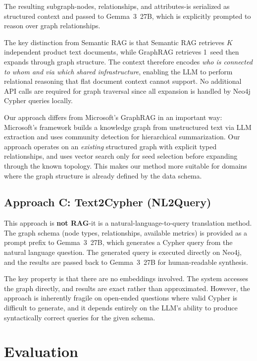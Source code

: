 \documentclass[11pt,a4paper]{article}
\begin{document}
The resulting subgraph-nodes, relationships, and attributes-is serialized as structured context and passed to Gemma~3~27B, which is explicitly prompted to reason over graph relationships.

The key distinction from Semantic RAG is that Semantic RAG retrieves $K$ independent product text documents, while GraphRAG retrieves 1~seed then expands through graph structure. The context therefore encodes \textit{who is connected to whom and via which shared infrastructure}, enabling the LLM to perform relational reasoning that flat document context cannot support. No additional API calls are required for graph traversal since all expansion is handled by Neo4j Cypher queries locally.

Our approach differs from Microsoft's GraphRAG in an important way: Microsoft's framework builds a knowledge graph from unstructured text via LLM extraction and uses community detection for hierarchical summarization. Our approach operates on an \textit{existing} structured graph with explicit typed relationships, and uses vector search only for seed selection before expanding through the known topology. This makes our method more suitable for domains where the graph structure is already defined by the data schema.

\subsection{Approach C: Text2Cypher (NL2Query)}

This approach is \textbf{not RAG}-it is a natural-language-to-query translation method. The graph schema (node types, relationships, available metrics) is provided as a prompt prefix to Gemma~3~27B, which generates a Cypher query from the natural language question. The generated query is executed directly on Neo4j, and the results are passed back to Gemma~3~27B for human-readable synthesis.

The key property is that there are no embeddings involved. The system accesses the graph directly, and results are exact rather than approximated. However, the approach is inherently fragile on open-ended questions where valid Cypher is difficult to generate, and it depends entirely on the LLM's ability to produce syntactically correct queries for the given schema.

\section{Evaluation}
\end{document}
